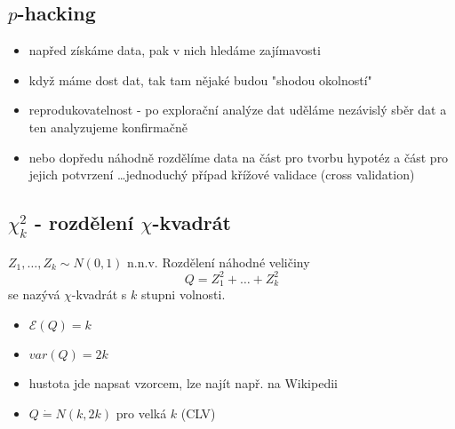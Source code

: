 \documentclass[../main.tex]{subfiles}
\begin{document}
\subsection{$p$-hacking}
\begin{itemize}
    \item napřed získáme data, pak v nich hledáme zajímavosti
    \item když máme dost dat, tak tam nějaké budou "shodou okolností"
    \item reprodukovatelnost - po explorační analýze dat uděláme nezávislý sběr dat a ten analyzujeme konfirmačně
    \item nebo dopředu náhodně rozdělíme data na část pro tvorbu hypotéz a část pro jejich potvrzení \dots jednoduchý případ křížové validace (cross validation)
\end{itemize}
\subsection{$\chi^2_k$ - rozdělení $\chi$-kvadrát}
\begin{definition}
    $Z_1,\dots,Z_k \sim N(0,1)$ n.n.v. Rozdělení náhodné veličiny
    \[Q = Z^2_1 + \dots + Z^2_k\]
    se nazývá $\chi$-kvadrát s $k$ stupni volnosti.
    \begin{itemize}
        \item $\mathcal{E}(Q) = k$
        \item $var(Q) = 2k$
        \item hustota jde napsat vzorcem, lze najít např. na Wikipedii
        \item $Q \dot{=} N(k,2k)$ pro velká $k$ (CLV)
    \end{itemize}
\end{definition}
\end{document}
